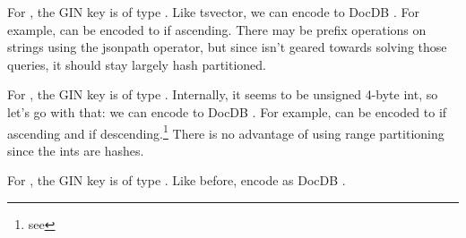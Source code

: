 For , the GIN key is of type .  Like
tsvector, we can encode to DocDB .  For example,
 can be encoded to  if
ascending.  There may be prefix operations on strings using the
 jsonpath operator, but since 
isn't geared towards solving those queries, it should stay largely hash
partitioned.

For , the GIN key is of type .
Internally, it seems to be unsigned 4-byte int, so let's go with that: we can
encode to DocDB .  For example,  can
be encoded to  if ascending and
 if descending.\footnote{see
}  There is no advantage of using range
partitioning since the ints are hashes.

For , the GIN key is of type .  Like
before, encode as DocDB .
